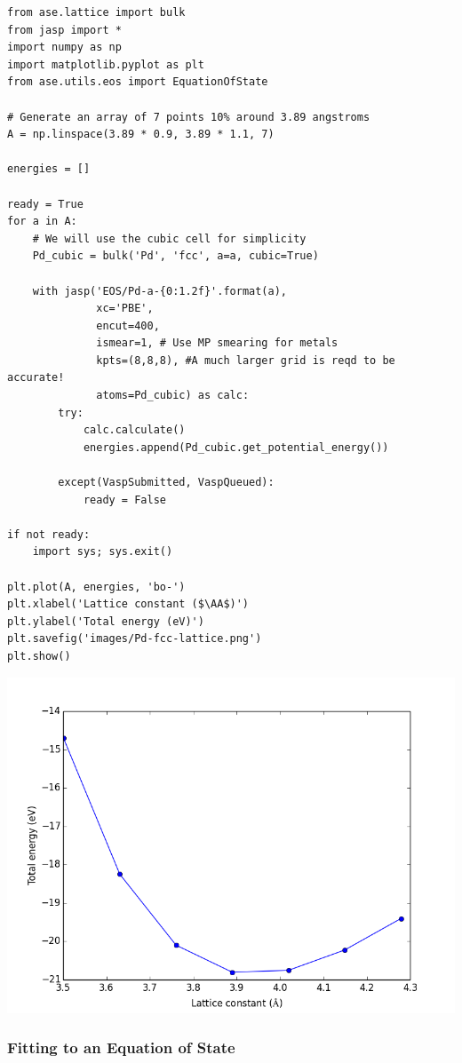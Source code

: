 \documentclass[11pt]{article}
\begin{document}
\begin{verbatim}
from ase.lattice import bulk
from jasp import *
import numpy as np
import matplotlib.pyplot as plt
from ase.utils.eos import EquationOfState

# Generate an array of 7 points 10% around 3.89 angstroms
A = np.linspace(3.89 * 0.9, 3.89 * 1.1, 7) 

energies = []

ready = True
for a in A:
    # We will use the cubic cell for simplicity
    Pd_cubic = bulk('Pd', 'fcc', a=a, cubic=True)
    
    with jasp('EOS/Pd-a-{0:1.2f}'.format(a),
              xc='PBE',
              encut=400,
              ismear=1, # Use MP smearing for metals
              kpts=(8,8,8), #A much larger grid is reqd to be accurate!
              atoms=Pd_cubic) as calc:
        try:
            calc.calculate()
            energies.append(Pd_cubic.get_potential_energy())
                                       
        except(VaspSubmitted, VaspQueued):
            ready = False

if not ready:
    import sys; sys.exit()              

plt.plot(A, energies, 'bo-')
plt.xlabel('Lattice constant ($\AA$)')
plt.ylabel('Total energy (eV)')
plt.savefig('images/Pd-fcc-lattice.png')
plt.show()
\end{verbatim}

\includegraphics[width=.9\linewidth]{./images/Pd-fcc-lattice.png}


\subsubsection{Fitting to an Equation of State}
\label{sec-2-3-2}
\end{document}
